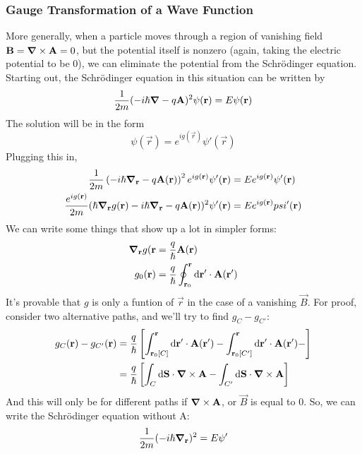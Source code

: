 \documentclass[a4paper]{article}
\begin{document}
\subsubsection{Gauge Transformation of a Wave Function}
More generally, when a particle moves through a region of vanishing field
$\vec{B} = \del\times\vec{A} = 0$, but the potential itself is nonzero (again,
taking the electric potential to be 0), we can eliminate the potential from the
Schr\"odinger equation. Starting out, the Schr\"odinger equation in this
situation can be written by
\[
	\frac{1}{2m}(-i\hslash\del - q\vec{A})^2\psi(\vec{r}) = E\psi(\vec{r})
\]
The solution will be in the form
\[
	\psi(\vec{r}) = e^{ig(\vec{r})}\psi'(\vec{r})
\]
Plugging this in,
\begin{align*}
	\frac{1}{2m}\left(-i\hslash\del_{\vec{r}}-q\vec{A}(\vec{r}) \right)^2
		e^{ig(\vec{r})}\psi'(\vec{r}) &=
		Ee^{ig(\vec{r})}\psi'(\vec{r})\\
		\frac{e^{ig(\vec{r})}}{2m}(\hslash\del_{\vec{r}} g(\vec{r}) -
		i\hslash\del_{\vec{r}} - q\vec{A}(\vec{r}) )^2\psi'(\vec{r}) &=
		Ee^{ig(\vec{r})}psi'(\vec{r})
\end{align*}
We can write some things that show up a lot in simpler forms:
\begin{align*}
	\del_{\vec{r}}g(\vec{r} &= \frac{q}{\hslash}\vec{A}(\vec{r})\\
	g_0(\vec{r}) &= \frac{q}{\hslash}\oint_{\vec{r}_0}^{\vec{r}}
		\d\vec{r}'\cdot\vec{A}(\vec{r}')
\end{align*}
It's provable that $g$ is only a funtion of $\vec{r}$ in the case of a
vanishing $\vec{B}$. For proof, consider two alternative paths, and we'll try
to find $g_C - g_{C'}$:
\begin{align*}
	g_C(\vec{r}) - g_{C'}(\vec{r}) &=
	\frac{q}{\hslash}\left[
		\int_{\vec{r}_0[C]}^{\vec{r}}\d\vec{r}'\cdot\vec{A}(\vec{r}') -
		\int_{\vec{r}_0[C']}^{\vec{r}}\d\vec{r}'\cdot\vec{A}(\vec{r}') -
	\right]\\
	&= \frac{q}{\hslash}\left[\int_{C}\d\vec{S}\cdot\del\times\vec{A} - 
	\int_{C'}\d\vec{S}\cdot\del\times\vec{A}\right]
\end{align*}
And this will only be for different paths if $\del\times\vec{A}$, or $\vec{B}$
is equal to 0. So, we can write the Schr\"odinger equation without A:
\[
	\frac{1}{2m}(-i\hslash\del_{\vec{r}})^2 = E\psi'
\]
\end{document}
